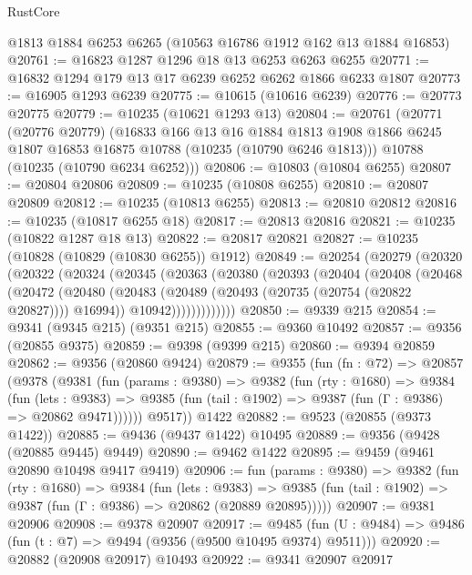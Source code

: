 \begin{lexlean}{RustCore}
\begin{coremodule}
    @1813
    @1884
    @6253
    @6265
    (@10563 @16786 @1912 @162 @13 @1884 @16853)
@20761 := @16823 @1287 @1296 @18 @13 @6253 @6263 @6255
@20771 := @16832 @1294 @179 @13 @17 @6239 @6252 @6262 @1866 @6233 @1807
@20773 := @16905 @1293 @6239
@20775 := @10615 (@10616 @6239)
@20776 := @20773 @20775
@20779 := @10235 (@10621 @1293 @13)
@20804 := @20761
    (@20771
      (@20776 @20779)
      (@16833
        @166
        @13
        @16
        @1884
        @1813
        @1908
        @1866
        @6245
        @1807
        @16853
        @16875
        @10788
        (@10235 (@10790 @6246 @1813)))
      @10788
      (@10235 (@10790 @6234 @6252)))
@20806 := @10803 (@10804 @6255)
@20807 := @20804 @20806
@20809 := @10235 (@10808 @6255)
@20810 := @20807 @20809
@20812 := @10235 (@10813 @6255)
@20813 := @20810 @20812
@20816 := @10235 (@10817 @6255 @18)
@20817 := @20813 @20816
@20821 := @10235 (@10822 @1287 @18 @13)
@20822 := @20817 @20821
@20827 := @10235 (@10828 (@10829 (@10830 @6255)) @1912)
@20849 := @20254
    (@20279
      (@20320
        (@20322
          (@20324
            (@20345
              (@20363
                (@20380
                  (@20393
                    (@20404
                      (@20408
                        (@20468
                          (@20472
                            (@20480
                              (@20483 (@20489 (@20493 (@20735 (@20754 (@20822 @20827)))) @16994))
                              @10942)))))))))))))
@20850 := @9339 @215
@20854 := @9341 (@9345 @215) (@9351 @215)
@20855 := @9360 @10492
@20857 := @9356 (@20855 @9375)
@20859 := @9398 (@9399 @215)
@20860 := @9394 @20859
@20862 := @9356 (@20860 @9424)
@20879 := @9355
    (fun (fn : @72) =>
    @20857
      (@9378
        (@9381
          (fun (params : @9380) =>
          @9382
            (fun (rty : @1680) =>
            @9384
              (fun (lets : @9383) =>
              @9385 (fun (tail : @1902) => @9387 (fun (Γ : @9386) => @20862 @9471))))))
        @9517))
    @1422
@20882 := @9523 (@20855 (@9373 @1422))
@20885 := @9436 (@9437 @1422) @10495
@20889 := @9356 (@9428 (@20885 @9445) @9449)
@20890 := @9462 @1422
@20895 := @9459 (@9461 @20890 @10498 @9417 @9419)
@20906 := fun (params : @9380) =>
  @9382
    (fun (rty : @1680) =>
    @9384
      (fun (lets : @9383) =>
      @9385 (fun (tail : @1902) => @9387 (fun (Γ : @9386) => @20862 (@20889 @20895)))))
@20907 := @9381 @20906
@20908 := @9378 @20907
@20917 := @9485
    (fun (U : @9484) => @9486 (fun (t : @7) => @9494 (@9356 (@9500 @10495 @9374) @9511)))
@20920 := @20882 (@20908 @20917) @10493
@20922 := @9341 @20907 @20917

\end{coremodule}
\end{lexlean}

